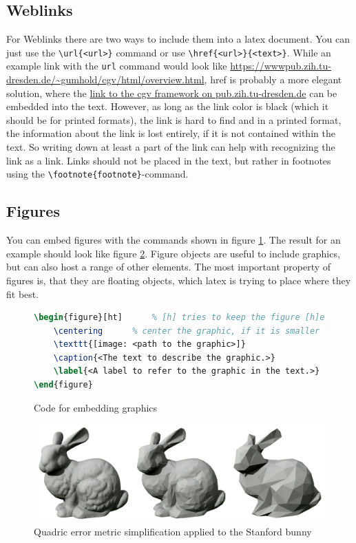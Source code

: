 \subsection{Weblinks}
For Weblinks there are two ways to include them into a latex document. You can just use the \texttt{\textbackslash url\{<url>\}} command or use \texttt{\textbackslash href\{<url>\}\{<text>\}}.
While an example link with the \texttt{url} command would look like \url{https://wwwpub.zih.tu-dresden.de/~gumhold/cgv/html/overview.html}, href is probably a more elegant solution, where the \href{https://wwwpub.zih.tu-dresden.de/~gumhold/cgv/html/overview.html}{link to the cgv framework on pub.zih.tu-dresden.de} can be embedded into the text. However, as long as the link color is black (which it should be for printed formats), the link is hard to find and in a printed format, the information about the link is lost entirely, if it is not contained within the text. So writing down at least a part of the link can help with recognizing the link as a link. Links should not be placed in the text, but rather in footnotes using the \texttt{\textbackslash footnote\{footnote\}}-command. 

\subsection{Figures}
\label{texbas:fig}
You can embed figures with the commands shown in figure \ref{fig:code_for_fig}. The result for an example should look like figure \ref{fig:Stanf_Bunny}. Figure objects are useful to include graphics, but can also host a range of other elements. The most important property of figures is, that they are floating objects, which latex is trying to place where they fit best.

\begin{figure}[ht]
	\begin{lstlisting}[language=TeX]
\begin{figure}[ht] 		% [h] tries to keep the figure [h]ere, [t]op is used as alternative
	\centering		% center the graphic, if it is smaller then the page
	\texttt{[image: <path to the graphic>]}
	\caption{<The text to describe the graphic.>}
	\label{<A label to refer to the graphic in the text.>}
\end{figure}	
	\end{lstlisting}
	\caption{Code for embedding graphics}
	\label{fig:code_for_fig}
\end{figure}

\begin{figure}[ht]
	\centering
	\includegraphics[width=1\textwidth]{fig/Stanford_bunny_qem.png}
	\caption{Quadric error metric simplification applied to the Stanford bunny}
	\label{fig:Stanf_Bunny}
\end{figure}


